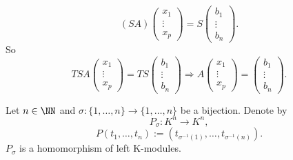\begin{proofenv}
     \begin{equation*}
        (SA)\begin{pmatrix}
        x_1\\
        \vdots\\
        x_p
        \end{pmatrix}=S\begin{pmatrix}
        b_1\\
        \vdots\\
        b_n
        \end{pmatrix}.
    \end{equation*}
    So 
     \begin{equation*}
        TSA\begin{pmatrix}
        x_1\\
        \vdots\\
        x_p
        \end{pmatrix}=TS\begin{pmatrix}
        b_1\\
        \vdots\\
        b_n
        \end{pmatrix}
        \Rightarrow
        A\begin{pmatrix}
        x_1\\        
        \vdots\\
        x_p
        \end{pmatrix}=\begin{pmatrix}
        b_1\\
        \vdots\\
        b_n
        \end{pmatrix}.
    \end{equation*}
\end{proofenv}
\begin{definitionenv}
    Let $n\in\NN$ and $\sigma:\{1,\dots,n\}\rightarrow\{1,\dots,n\}$ be a bijection. Denote by 
    $$P_\sigma:K^n\longrightarrow K^n,$$
    $$P(t_1,\dots,t_n):=\left(t_{\sigma^{-1}(1)},\dots,t_{\sigma^{-1}(n)}\right).$$
    $P_\sigma$ is a homomorphism of left K-modules.
\end{definitionenv}
